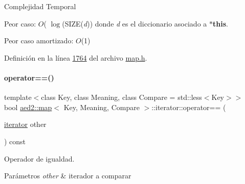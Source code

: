 \begin{DoxyDescription}
\item[Complejidad Temporal]
\begin{DoxyItemize}
\item Peor caso\+: $O$( $\log$(S\+I\+ZE({\itshape d})) donde {\itshape d} es el diccionario asociado a {\bfseries $\ast$this}.
\item Peor caso amortizado\+: $O$(1) 
\end{DoxyItemize}
\end{DoxyDescription}

Definición en la línea \hyperlink{map_8h_source_l01764}{1764} del archivo \hyperlink{map_8h_source}{map.\+h}.

\mbox{\label{classaed2_1_1map_1_1iterator_a34f6622845af93ca42f1be8516eeafa2_a34f6622845af93ca42f1be8516eeafa2}} 
\paragraph{\texorpdfstring{operator==()}{operator==()}}
{\footnotesize\ttfamily template$<$class Key, class Meaning, class Compare = std\+::less$<$\+Key$>$$>$ \\
bool \hyperlink{classaed2_1_1map}{aed2\+::map}$<$ Key, Meaning, Compare $>$\+::iterator\+::operator== (\begin{DoxyParamCaption}\item[{\hyperlink{classaed2_1_1map_1_1iterator}{iterator}}]{other }\end{DoxyParamCaption}) const\hspace{0.3cm}{\ttfamily [inline]}}



Operador de igualdad. 


\begin{DoxyParams}{Parámetros}
{\em other} & iterador a comparar \\
\hline
\end{DoxyParams}


